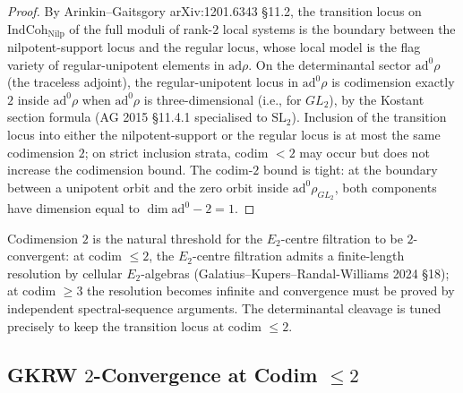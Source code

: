 \begin{proof}
By Arinkin--Gaitsgory arXiv:1201.6343 \S 11.2, the transition locus
on \(\mathrm{IndCoh}_{\mathrm{Nilp}}\) of the full moduli of rank-\(2\)
local systems is the boundary between the nilpotent-support locus
and the regular locus, whose local model is the flag variety of
regular-unipotent elements in \(\mathrm{ad}\rho\). On the determinantal
sector \(\mathrm{ad}^{0}\rho\) (the traceless adjoint), the
regular-unipotent locus in \(\mathrm{ad}^{0}\rho\) is codimension
exactly \(2\) inside \(\mathrm{ad}^{0}\rho\) when \(\mathrm{ad}^{0}\rho\)
is three-dimensional (i.e., for \(GL_{2}\)), by the Kostant section
formula (AG 2015 \S 11.4.1 specialised to \(\mathrm{SL}_{2}\)).
Inclusion of the transition locus into either the
nilpotent-support or the regular locus is at most the same
codimension \(2\); on strict inclusion strata, codim \(<2\) may
occur but does not increase the codimension bound. The codim-\(2\)
bound is tight: at the boundary between a unipotent orbit and the
zero orbit inside \(\mathrm{ad}^{0}\rho_{GL_{2}}\), both components
have dimension equal to \(\dim\mathrm{ad}^{0}-2=1\).
\end{proof}

\begin{remark}
\label{v4-arith:w6-g:rem:codim-2-role}
Codimension \(2\) is the natural threshold for the \(E_{2}\)-centre
filtration to be \(2\)-convergent: at codim \(\leq 2\), the
\(E_{2}\)-centre filtration admits a finite-length resolution by
cellular \(E_{2}\)-algebras (Galatius--Kupers--Randal-Williams 2024
\S 18); at codim \(\geq 3\) the resolution becomes infinite and
convergence must be proved by independent spectral-sequence
arguments. The determinantal cleavage is tuned precisely to keep
the transition locus at codim \(\leq 2\).
\end{remark}

\subsection{GKRW \(2\)-Convergence at Codim \(\leq 2\)}

